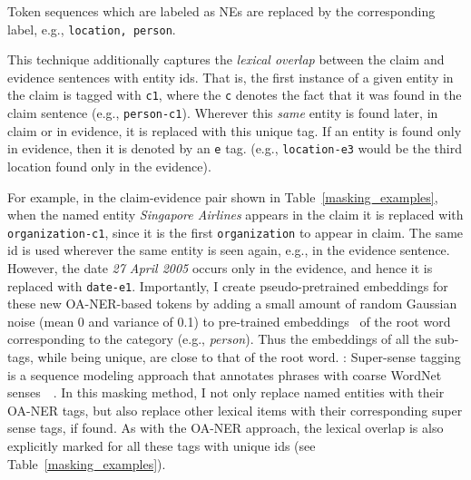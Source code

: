 \documentclass{article}
\begin{document}
{}  Token sequences which are labeled as NEs are replaced by the corresponding label, e.g., \texttt{location, person}.

{} This technique additionally captures the \textit{lexical overlap} between the claim and evidence sentences with entity ids.  
That is, the first instance of a given entity in the claim is tagged with \texttt{c1}, where the \texttt{c} denotes the fact that it was found in the claim sentence (e.g., \texttt{person-c1}). Wherever this {\em same} entity is found later, in claim or in evidence, it is replaced with this unique tag. If an entity is found only in evidence, then it is denoted by an \texttt{e} tag. (e.g., \texttt{location-e3} would be the third location found only in the evidence).

For example, in the claim-evidence pair shown in Table~\ref{masking_examples}, when the named entity \textit{Singapore Airlines} appears in the claim it is replaced with \texttt{organization-c1}, since it is the first \texttt{organization} to appear in claim. 
The same id is used wherever the same entity is seen again, e.g., in the evidence sentence. However, the date \textit{27 April 2005} occurs only in the evidence, and hence it is replaced with \texttt{date-e1}.
Importantly, I create pseudo-pretrained embeddings for these new OA-NER-based tokens by adding a small amount of random Gaussian noise (mean 0 and variance of 0.1) to pre-trained embeddings~\citep*{pennington2014glove} of the root word corresponding to the category (e.g., \textit{person}). Thus the embeddings of all the sub-tags, while being unique, are close to that of the root word.
{}:
Super-sense tagging is a sequence modeling approach that annotates phrases with coarse WordNet senses~\citep*{ciaramita2003supersense}~\citep*{miller1990introduction}. In this masking method, I not only replace named entities with their OA-NER tags, but also replace other lexical items with their corresponding super sense tags, if found. As with the OA-NER approach, the lexical overlap is also explicitly marked for all these tags with unique ids (see Table~\ref{masking_examples}). 
\end{document}
